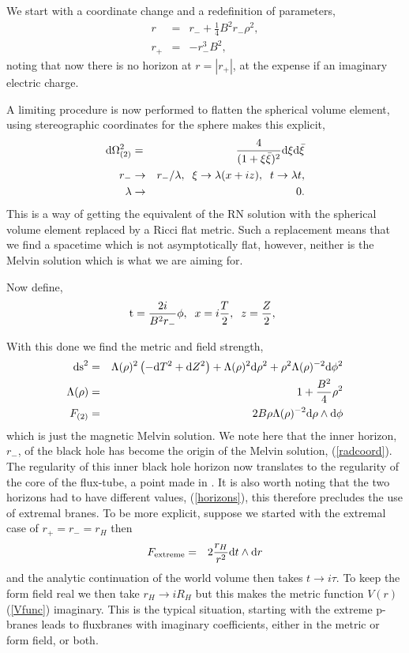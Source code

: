 \documentclass[a4paper,11pt]{article}
\begin{document}
We start with a coordinate change and a redefinition of parameters,
\begin{eqnarray}
\label{radcoord}
r&=&r_-+\frac{1}{4}B^2r_-\rho^2,\\
\label{horizons}
r_+&=&-r_-^3B^2,
\end{eqnarray}
noting that now there is no horizon at $r=|r_+|$, at the expense if an imaginary
electric charge.

A limiting procedure is now performed to flatten the spherical volume
element,
using stereographic coordinates for the sphere makes this explicit,
\begin{eqnarray}
{\rm d}\Omega_{(2)}^2&=&\frac{4}{(1+\xi\bar{\xi})^2}{\rm d}\xi{\rm d}\bar{\xi}\\
r_-&\rightarrow& r_-/\lambda,\;\;
\xi\rightarrow \lambda(x+iz),\;\;
t\rightarrow \lambda t,\\
\lambda&\rightarrow& 0.
\end{eqnarray}
This is a way of getting the equivalent of the RN solution with the
spherical volume element replaced by a Ricci flat metric. 
Such a replacement means that we find a spacetime which is not asymptotically
flat, however, neither is the Melvin solution which is what we are aiming for.

Now define,
\begin{eqnarray}
{\rm t}=\frac{2i}{B^2r_-}\phi,\;\;
x=i\frac{T}{2},\;\;
z=\frac{Z}{2},\;\;
\end{eqnarray}

With this done we find the metric and field strength,
\begin{eqnarray}
{\rm ds}^2&=&\Lambda(\rho)^2\left(-{\rm d}T^2+{\rm d}Z^2\right)
             +\Lambda(\rho)^2{\rm d}\rho^2
             +\rho^2\Lambda(\rho)^{-2}{\rm d}\phi^2\\
\Lambda(\rho)&=&1+\frac{B^2}{4}\rho^2\\
F_{(2)}&=&2B\rho\Lambda(\rho)^{-2}{\rm d}\rho\wedge{\rm d}\phi
\end{eqnarray}
which is just the magnetic Melvin solution. We note here that the inner horizon,
$r_-$, of the black hole has become the origin of the Melvin solution, 
(\ref{radcoord}). The regularity of this inner black hole horizon 
now translates
to the regularity of the core of the flux-tube, a point made in 
\cite{gibbons88}.
It is also worth noting that the two horizons had to have different 
values, (\ref{horizons}), this
therefore precludes the use of extremal branes. To be more explicit,
suppose we started with the extremal case of \mbox{$r_+=r_-=r_H$} then
\begin{eqnarray}
F_{\rm extreme}&=&2\frac{r_H}{r^2}{\rm d}t\wedge{\rm d}r
\end{eqnarray}
and the analytic continuation of the world volume then takes 
\mbox{$t\rightarrow i\tau$}. To keep the form field real we then take
\mbox{$r_H\rightarrow iR_H$} but this makes the metric
function $V(r)$ (\ref{Vfunc})
imaginary. This is the typical situation, starting with
the extreme p-branes leads to fluxbranes with imaginary coefficients,
either in the metric or form field, or both.
\end{document}

